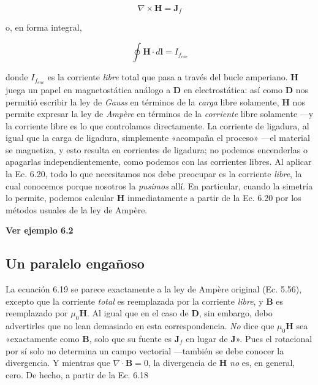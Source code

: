 \documentclass[12pt,a4paper]{report}
\newcommand{\esp}{\vspace{0.5cm}}
\begin{document}
	\begin{equation}
		\nabla \times \mathbf{H} = \mathbf{J}_f \tag{6.19}
	\end{equation}
	
	\noindent o, en forma integral,
	
	\begin{equation}
		\oint \mathbf{H} \cdot d\mathbf{l} = I_{f_{enc}} \tag{6.20}
	\end{equation}
	
	donde $I_{f_{enc}}$ es la corriente \textit{libre} total que pasa a través del bucle amperiano. $\mathbf{H}$ juega un papel en magnetostática análogo a $\mathbf{D}$ en electrostática: así como $\mathbf{D}$ nos permitió escribir la ley de \textit{Gauss} en términos de la \textit{carga} libre solamente, $\mathbf{H}$ nos permite expresar la ley de \textit{Ampère} en términos de la \textit{corriente} libre solamente —y la corriente libre es lo que controlamos directamente. La corriente de ligadura, al igual que la carga de ligadura, simplemente «acompaña el proceso» —el material se magnetiza, y esto resulta en corrientes de ligadura; no podemos encenderlas o apagarlas independientemente, como podemos con las corrientes libres. Al aplicar la Ec. 6.20, todo lo que necesitamos nos debe preocupar es la corriente \textit{libre}, la cual conocemos porque nosotros la \textit{pusimos} allí. En particular, cuando la simetría lo permite, podemos calcular $\mathbf{H}$ inmediatamente a partir de la Ec. 6.20 por los métodos usuales de la ley de Ampère.
	
	\esp
	
	\noindent \textbf{Ver ejemplo 6.2}
	
	\esp
	
	\subsection{Un paralelo engañoso}

	La ecuación 6.19 se parece exactamente a la ley de Ampère original (Ec. 5.56), excepto que la corriente \textit{total} es reemplazada por la corriente \textit{libre}, y $\mathbf{B}$ es reemplazado por $\mu_0\mathbf{H}$. Al igual que en el caso de $\mathbf{D}$, sin embargo, debo advertirles que no lean demasiado en esta correspondencia. \textit{No} dice que $\mu_0\mathbf{H}$ sea «exactamente como $\mathbf{B}$, solo que su fuente es $\mathbf{J}_f$ en lugar de $\mathbf{J}$». Pues el rotacional por sí solo no determina un campo vectorial —también se debe conocer la divergencia. Y mientras que $\nabla \cdot \mathbf{B} = 0$, la divergencia de $\mathbf{H}$ \textit{no} es, en general, cero. De hecho, a partir de la Ec. 6.18
	
\end{document}
